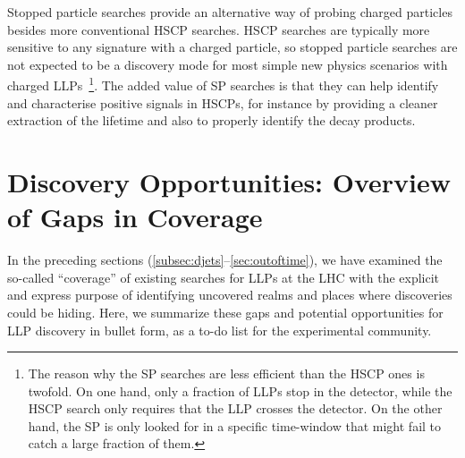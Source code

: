 {Stopped particle searches provide an alternative way of probing charged particles besides more conventional HSCP searches. HSCP searches are typically more sensitive to any signature with a charged particle, so stopped particle searches are not expected to be a discovery mode for most simple new physics scenarios with charged LLPs~\footnote{The reason why the SP searches are less efficient than the HSCP ones is twofold. On one hand, only a fraction of LLPs stop in the detector, while the HSCP search only requires that the LLP crosses the detector. On the other hand, the SP is only looked for in a specific time-window that might fail to catch a large fraction of them.}. The added value of SP searches is that they can help identify and characterise positive signals in HSCPs, for instance by providing a cleaner extraction of the lifetime and also to properly identify the decay products.

\section{Discovery Opportunities: Overview of Gaps in Coverage}
\label{sec:covgaps}

In the preceding sections (\ref{subsec:djets}--\ref{sec:outoftime}), we have examined the so-called ``coverage'' of existing searches for LLPs at the LHC with the explicit and express purpose of identifying uncovered realms and places where discoveries could be hiding. Here, we summarize these gaps and potential opportunities for LLP discovery in bullet form, as a to-do list for the experimental community.

}
